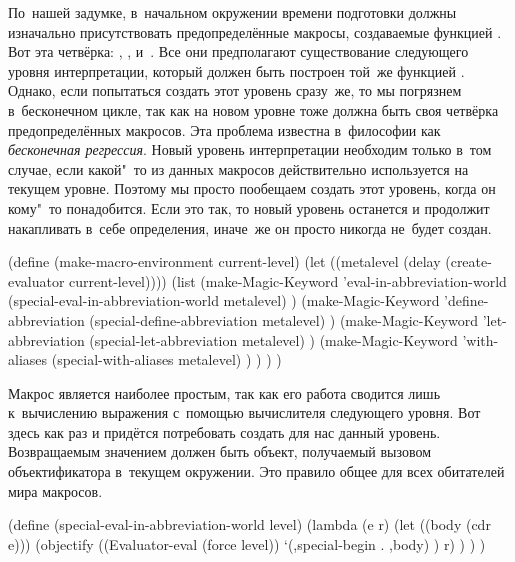 По~нашей задумке, в~начальном окружении времени подготовки должны изначально
присутствовать предопределённые макросы, создаваемые функцией
. Вот эта четвёрка: ,
,  и~. Все они
предполагают существование следующего уровня интерпретации, который должен быть
построен той~же функцией . Однако, если попытаться
создать этот уровень сразу~же, то мы погрязнем в~бесконечном цикле, так как на
новом уровне тоже должна быть своя четвёрка предопределённых макросов. Эта
проблема известна в~философии как \emph{бесконечная регрессия}. Новый уровень
интерпретации необходим только в~том случае, если какой"~то из данных макросов
действительно используется на текущем уровне.  Поэтому
мы просто пообещаем создать этот уровень, когда он кому"~то понадобится. Если
это так, то новый уровень останется и продолжит накапливать в~себе определения,
иначе~же он просто никогда не~будет создан.


\begin{code:lisp}
(define (make-macro-environment current-level)
  (let ((metalevel (delay (create-evaluator current-level))))
    (list (make-Magic-Keyword 'eval-in-abbreviation-world
           (special-eval-in-abbreviation-world metalevel) )
          (make-Magic-Keyword 'define-abbreviation
           (special-define-abbreviation metalevel) )
          (make-Magic-Keyword 'let-abbreviation
           (special-let-abbreviation metalevel) )
          (make-Magic-Keyword 'with-aliases
           (special-with-aliases metalevel) ) ) ) )
\end{code:lisp}

Макрос  является наиболее простым, так как его
работа сводится лишь к~вычислению выражения с~помощью вычислителя следующего
уровня. Вот здесь как раз и придётся потребовать создать для нас данный уровень.
Возвращаемым значением  должен быть объект,
получаемый вызовом объектификатора в~текущем окружении. Это правило общее для
всех обитателей мира макросов.

\begin{code:lisp}
(define (special-eval-in-abbreviation-world level)
  (lambda (e r)
    (let ((body (cdr e)))
      (objectify ((Evaluator-eval (force level))
                  `(,special-begin . ,body) ) r) ) ) )
\end{code:lisp}

